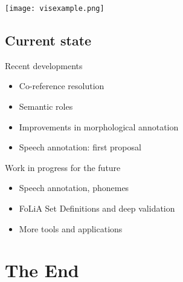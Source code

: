 \documentclass[compress]{beamer}
\begin{document}
\begin{frame}[fragile]
   \texttt{[image: visexample.png]}
\end{frame}



\subsection{Current state}

\begin{frame}
	\begin{block}{Recent developments}
	  \begin{itemize}
		\item Co-reference resolution
		\item Semantic roles
		\item Improvements in morphological annotation
		\item Speech annotation: first proposal
	  \end{itemize}
	\end{block}

	\begin{block}{Work in progress for the future}
	  \begin{itemize}
		\item Speech annotation, phonemes
		\item FoLiA Set Definitions and deep validation
		\item More tools and applications
	  \end{itemize}
	\end{block}
\end{frame}


\section{The End}
\end{document}
